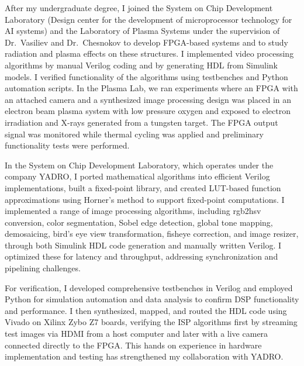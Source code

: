 \documentclass[a4paper,12pt]{article}
\begin{document}
After my undergraduate degree, I joined the System on Chip Development Laboratory (Design center for the development of microprocessor technology for AI systems) and the Laboratory of Plasma Systems under the supervision of Dr.\ Vasiliev and Dr.\ Chesnokov to develop FPGA-based systems and to study radiation and plasma effects on these structures. I implemented video processing algorithms by manual Verilog coding and by generating HDL from Simulink models. I verified functionality of the algorithms using testbenches and Python automation scripts. In the Plasma Lab, we ran experiments where an FPGA with an attached camera and a synthesized image processing design was placed in an electron beam plasma system with low pressure oxygen and exposed to electron irradiation and X-rays generated from a tungsten target. The FPGA output signal was monitored while thermal cycling was applied and preliminary functionality tests were performed.
\vspace{10pt}

\newpage

In the System on Chip Development Laboratory, which operates under the company YADRO, I ported mathematical algorithms into efficient Verilog implementations, built a fixed-point library, and created LUT-based function approximations using Horner’s method to support fixed-point computations. I implemented a range of image processing algorithms, including rgb2hsv conversion, color segmentation, Sobel edge detection, global tone mapping, demosaicing, bird’s eye view transformation, fisheye correction, and image resizer, through both Simulink HDL code generation and manually written Verilog. I optimized these for latency and throughput, addressing synchronization and pipelining challenges. 
\vspace{10pt}

For verification, I developed comprehensive testbenches in Verilog and employed Python for simulation automation and data analysis to confirm DSP functionality and performance. I then synthesized, mapped, and routed the HDL code using Vivado on Xilinx Zybo Z7 boards, verifying the ISP algorithms first by streaming test images via HDMI from a host computer and later with a live camera connected directly to the FPGA. This hands on experience in hardware implementation and testing has strengthened my collaboration with YADRO.
\end{document}
